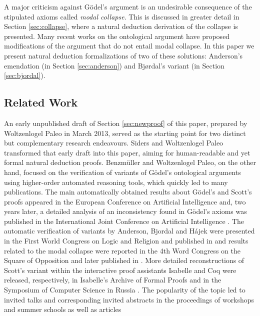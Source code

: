 \documentclass[smallextended]{svjour3}
\begin{document}
A major criticism against G\"odel's argument is an undesirable consequence of the stipulated axioms called \emph{modal collapse}. This is discussed in greater detail in Section \ref{sec:collapse}, where a natural deduction derivation of the collapse is presented. Many recent works on the ontological argument have proposed modifications of the argument that do not entail modal collapse. In this paper we present natural deduction formalizations of two of these solutions: Anderson's emendation (in Section \ref{sec:anderson}) and Bj{\o}rdal's variant (in Section \ref{sec:bjordal}).

\subsection{Related Work}

An early unpublished draft of Section \ref{sec:newproof} of this paper,
prepared by Woltzenlogel Paleo in March 2013, served as the starting
point for two distinct but complementary research endeavours. Siders
and Woltzenlogel Paleo transformed that early draft into this paper,
aiming for human-readable and yet formal natural deduction proofs.
Benzm\"uller and Woltzenlogel Paleo, on the other hand, focused on the
verification of variants of G\"odel's ontological arguments using
higher-order automated reasoning tools, which quickly led to many
publications. The main automatically obtained results about G\"odel's
and Scott's proofs appeared in the European Conference on Artificial
Intelligence \citep{ECAI2014} and, two years later, a detailed
analysis of an inconsistency found in G\"odel's axioms was published
in the International Joint Conference on Artificial Intelligence
\citep{IJCAI2016}. The automatic verification of variants by Anderson,
Bjordal and H\'ajek were presented in the First
World Congress on Logic and Religion
\citep{WorldCongressLogicAndReligion} and published in
\citep{controversy} and results related to the modal
collapse were reported in the 4th Word Congress on the Square of
Opposition \citep{SquareOfOpposition} and later published in
\citep{ModalCollapse}. More detailed reconstructions of Scott's
variant within the interactive proof assistants Isabelle and Coq were
released, respectively, in Isabelle's Archive of Formal Proofs
\citep{IsabelleGod} and in the Symposium of Computer Science in Russia
\citep{CSRModalLogicInCoq}. The popularity of the topic led to invited
talks and corresponding invited abstracts in the proceedings of
workshops \citep{WADT,WADTPreProceedings,IWIL} and summer schools
\citep{SpiritualQuest,ReasoningWebSummerSchool} as well as articles
\end{document}
